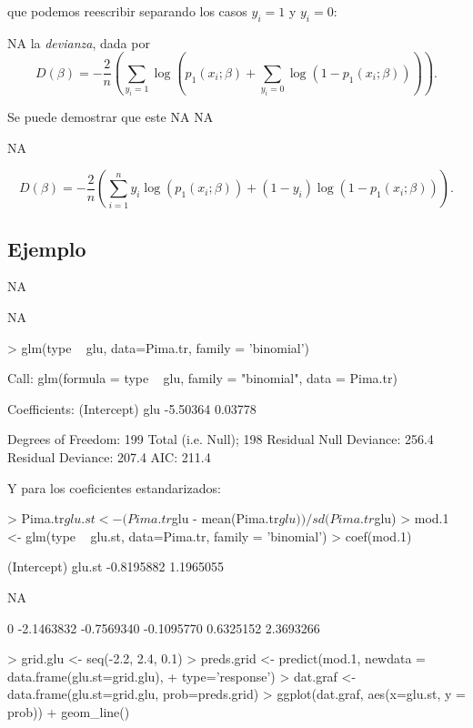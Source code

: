 \documentclass[nohyper]{tufte-handout}
\begin{document}
que podemos reescribir separando los casos $y_i=1$ y $y_i=0$:

\begin{shaded}
NA
la {\em devianza}, dada por
$$D(\beta) = -\frac{2}{n}\left(\sum_{y_i=1} \log(p_1(x_i;\beta) + \sum_{y_i=0}\log(1-p_1(x_i;\beta)))\right ).$$
\end{shaded}

 Se puede demostrar que este
NA
NA

NA

$$D(\beta) = -\frac{2}{n}\left(\sum_{i=1}^n
y_i\log(p_1(x_i;\beta)) + (1-y_i)\log(1-p_1(x_i;\beta))\right ).$$


\subsection{Ejemplo}
NA

NA

\begin{Schunk}
\begin{Sinput}
> glm(type ~ glu, data=Pima.tr, family = 'binomial')
\end{Sinput}
\begin{Soutput}
Call:  glm(formula = type ~ glu, family = "binomial", data = Pima.tr)

Coefficients:
(Intercept)          glu  
   -5.50364      0.03778  

Degrees of Freedom: 199 Total (i.e. Null);  198 Residual
Null Deviance:	    256.4 
Residual Deviance: 207.4 	AIC: 211.4
\end{Soutput}
\end{Schunk}

Y para los coeficientes estandarizados:
\begin{Schunk}
\begin{Sinput}
> Pima.tr$glu.st <- (Pima.tr$glu - mean(Pima.tr$glu))/sd(Pima.tr$glu)
> mod.1 <- glm(type ~ glu.st, data=Pima.tr, family = 'binomial')
> coef(mod.1)
\end{Sinput}
\begin{Soutput}
(Intercept)      glu.st 
 -0.8195882   1.1965055 
\end{Soutput}
\end{Schunk}

NA

\begin{Schunk}
\begin{Soutput}
        0%        25%        50%        75%       100% 
-2.1463832 -0.7569340 -0.1095770  0.6325152  2.3693266 
\end{Soutput}
\begin{Sinput}
> grid.glu <- seq(-2.2, 2.4, 0.1)
> preds.grid <- predict(mod.1, newdata = data.frame(glu.st=grid.glu), 
+   type='response')
> dat.graf <- data.frame(glu.st=grid.glu, prob=preds.grid)
> ggplot(dat.graf, aes(x=glu.st, y = prob)) + geom_line()
\end{Sinput}
\end{Schunk}
\end{document}
